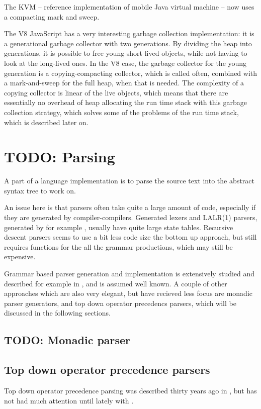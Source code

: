 The KVM -- reference implementation of mobile Java virtual machine -- now uses a compacting mark and sweep.

The V8 JavaScript has a very interesting garbage collection implementation: it is a generational garbage collector with two generations.
By dividing the heap into generations, it is possible to free young short lived objects, while not having to look at the long-lived ones. 
In the V8 case, the garbage collector for the young generation is a copying-compacting collector, which is called often, combined with a mark-and-sweep for the full heap, when that is needed.
The complexity of a copying collector is linear of the live objects, which means that there are essentially no overhead of heap allocating the run time stack with this garbage collection strategy, which solves some of the problems of the run time stack, which is described later on.

\section{TODO: Parsing}
A part of a language implementation is to parse the source text into the abstract syntax tree to work on. 

An issue here is that parsers often take quite a large amount of code, especially if they are generated by compiler-compilers.
Generated lexers and LALR(1) parsers, generated by for example \cite{yacc, yacc2}, usually have quite large state tables.
Recursive descent parsers seems to use a bit less code size the bottom up approach, but still requires functions for the all the grammar productions, which may still be expensive.

Grammar based parser generation and implementation is extensively studied and described for example in \cite{basics-of-compiler-design, grammar}, and is assumed well known.
A couple of other approaches which are also very elegant, 
but have recieved less focus are
monadic parser generators, and top down operator precedencs parsers,
which will be discussed in the following sections.

\subsection{TODO: Monadic parser}

\subsection{Top down operator precedence parsers}
\label{tdop}
Top down operator precedence parsing was described thirty years ago in \cite{top-down-operator-precedence}, but has not had much attention until lately with \cite{beautiful-code}.

